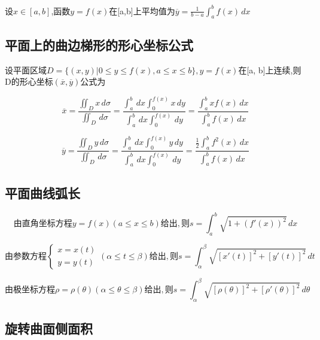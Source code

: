设\(x \in [a, b]\),函数\(y = f(x)\)在[a,b]上平均值为\(\overline{y} = \frac{1}{b- a} \int_{a}^{b} f(x) \,dx\)


\subsection{平面上的曲边梯形的形心坐标公式}

设平面区域\(D = \{ (x, y) | 0 \leq y \leq f(x), a \leq x \leq b \}, y = f(x)\)在[a, b]上连续,则D的形心坐标\((\overline{x}, \overline{y})\)公式为

\begin{displaymath}
\overline{x} = \frac{\iint_{D} x \,d\sigma}{\iint_{D} \,d\sigma} = 
\frac{\int_{a}^{b} \,dx \int_{0}^{f(x)} x \,dy}{\int_{a}^{b} \,dx \int_{0}^{f(x)} \,dy} =
\frac{\int_{a}^{b} xf(x) \,dx}{\int_{a}^{b} f(x) \,dx}
\end{displaymath}

\begin{displaymath}
\overline{y} = \frac{\iint_{D} y \,d\sigma}{\iint_{D} \,d\sigma} = 
\frac{\int_{a}^{b} \,dx \int_{0}^{f(x)} y \,dy}{\int_{a}^{b} \,dx \int_{0}^{f(x)} \,dy} =
\frac{\frac{1}{2}\int_{a}^{b} f^2(x) \,dx}{\int_{a}^{b} f(x) \,dx}
\end{displaymath}


\subsection{平面曲线弧长}

\begin{displaymath}
由直角坐标方程y = f(x)(a \leq x \leq b)给出,
则s = \int_{a}^{b} \sqrt{1 + (f'(x))^2} \,dx
\end{displaymath}

\begin{displaymath}
由参数方程
\begin{cases}
x = x(t) \\
y = y(t)
\end{cases}
(\alpha \leq t \leq \beta)给出,
则s = \int_{\alpha}^{\beta} \sqrt{[x'(t)]^2 + [y'(t)]^2} \,dt
\end{displaymath}

\begin{displaymath}
由极坐标方程\rho = \rho(\theta)(\alpha \leq \theta \leq \beta)给出,
则s = \int_{\alpha}^{\beta} \sqrt{[\rho(\theta)]^2 + [\rho'(\theta)]^2} \,d\theta
\end{displaymath}


\subsection{旋转曲面侧面积}

